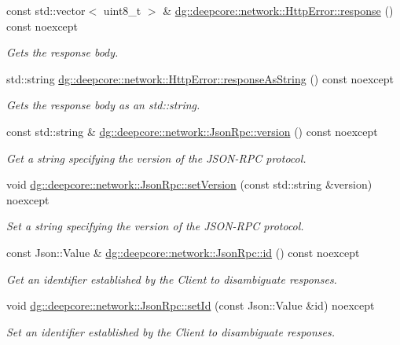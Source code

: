 \begin{DoxyCompactItemize}
const std\+::vector$<$ uint8\+\_\+t $>$ \& \hyperlink{group___network_module_gac1cbcd7696b0048a61231953d2aad0d7}{dg\+::deepcore\+::network\+::\+Http\+Error\+::response} () const noexcept
\begin{DoxyCompactList}\small\item\em Gets the response body. \end{DoxyCompactList}\item 
std\+::string \hyperlink{group___network_module_ga0768820112e9c0d089a04b9d98bb5bf2}{dg\+::deepcore\+::network\+::\+Http\+Error\+::response\+As\+String} () const noexcept
\begin{DoxyCompactList}\small\item\em Gets the response body as an std\+::string. \end{DoxyCompactList}\item 
const std\+::string \& \hyperlink{group___network_module_ga57b18a1db26df83b5d1769b6101ee67f}{dg\+::deepcore\+::network\+::\+Json\+Rpc\+::version} () const noexcept
\begin{DoxyCompactList}\small\item\em Get a string specifying the version of the J\+S\+O\+N-\/\+R\+PC protocol. \end{DoxyCompactList}\item 
void \hyperlink{group___network_module_ga7bfca4f17a0916e6f1313b04496b9e0d}{dg\+::deepcore\+::network\+::\+Json\+Rpc\+::set\+Version} (const std\+::string \&version) noexcept
\begin{DoxyCompactList}\small\item\em Set a string specifying the version of the J\+S\+O\+N-\/\+R\+PC protocol. \end{DoxyCompactList}\item 
const Json\+::\+Value \& \hyperlink{group___network_module_ga76f1d35ffeff40b5df1874c68b97c89a}{dg\+::deepcore\+::network\+::\+Json\+Rpc\+::id} () const noexcept
\begin{DoxyCompactList}\small\item\em Get an identifier established by the Client to disambiguate responses. \end{DoxyCompactList}\item 
void \hyperlink{group___network_module_gaf71b65c7bb55adbf936c38ffd1cd8289}{dg\+::deepcore\+::network\+::\+Json\+Rpc\+::set\+Id} (const Json\+::\+Value \&id) noexcept
\begin{DoxyCompactList}\small\item\em Set an identifier established by the Client to disambiguate responses. \end{DoxyCompactList}\item 

\end{DoxyCompactItemize}
